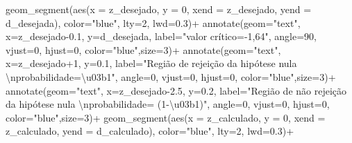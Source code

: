 \documentclass[
]{book}
\newenvironment{Shaded}{\begin{snugshade}}{\end{snugshade}}
\newcommand{\AttributeTok}[1]{\textcolor[rgb]{0.77,0.63,0.00}{#1}}
\newcommand{\DecValTok}[1]{\textcolor[rgb]{0.00,0.00,0.81}{#1}}
\newcommand{\FloatTok}[1]{\textcolor[rgb]{0.00,0.00,0.81}{#1}}
\newcommand{\FunctionTok}[1]{\textcolor[rgb]{0.00,0.00,0.00}{#1}}
\newcommand{\NormalTok}[1]{#1}
\newcommand{\SpecialCharTok}[1]{\textcolor[rgb]{0.00,0.00,0.00}{#1}}
\newcommand{\StringTok}[1]{\textcolor[rgb]{0.31,0.60,0.02}{#1}}
\begin{document}
\begin{Shaded}
\begin{Highlighting}[]
\FunctionTok{geom\_segment}\NormalTok{(}\FunctionTok{aes}\NormalTok{(}\AttributeTok{x =}\NormalTok{ z\_desejado, }\AttributeTok{y =} \DecValTok{0}\NormalTok{, }\AttributeTok{xend =}\NormalTok{ z\_desejado, }\AttributeTok{yend =}\NormalTok{ d\_desejada), }\AttributeTok{color=}\StringTok{"blue"}\NormalTok{, }\AttributeTok{lty=}\DecValTok{2}\NormalTok{, }\AttributeTok{lwd=}\FloatTok{0.3}\NormalTok{)}\SpecialCharTok{+}
\FunctionTok{annotate}\NormalTok{(}\AttributeTok{geom=}\StringTok{"text"}\NormalTok{, }\AttributeTok{x=}\NormalTok{z\_desejado}\FloatTok{{-}0.1}\NormalTok{, }\AttributeTok{y=}\NormalTok{d\_desejada, }\AttributeTok{label=}\StringTok{"valor crítico={-}1,64"}\NormalTok{, }\AttributeTok{angle=}\DecValTok{90}\NormalTok{, }\AttributeTok{vjust=}\DecValTok{0}\NormalTok{, }\AttributeTok{hjust=}\DecValTok{0}\NormalTok{, }\AttributeTok{color=}\StringTok{"blue"}\NormalTok{,}\AttributeTok{size=}\DecValTok{3}\NormalTok{)}\SpecialCharTok{+}
\FunctionTok{annotate}\NormalTok{(}\AttributeTok{geom=}\StringTok{"text"}\NormalTok{, }\AttributeTok{x=}\NormalTok{z\_desejado}\SpecialCharTok{+}\DecValTok{1}\NormalTok{, }\AttributeTok{y=}\FloatTok{0.1}\NormalTok{, }\AttributeTok{label=}\StringTok{"Região de rejeição da hipótese nula }\SpecialCharTok{\textbackslash{}n}\StringTok{probabilidade=\textbackslash{}u03b1"}\NormalTok{, }\AttributeTok{angle=}\DecValTok{0}\NormalTok{, }\AttributeTok{vjust=}\DecValTok{0}\NormalTok{, }\AttributeTok{hjust=}\DecValTok{0}\NormalTok{, }\AttributeTok{color=}\StringTok{"blue"}\NormalTok{,}\AttributeTok{size=}\DecValTok{3}\NormalTok{)}\SpecialCharTok{+}
\FunctionTok{annotate}\NormalTok{(}\AttributeTok{geom=}\StringTok{"text"}\NormalTok{, }\AttributeTok{x=}\NormalTok{z\_desejado}\FloatTok{{-}2.5}\NormalTok{, }\AttributeTok{y=}\FloatTok{0.2}\NormalTok{, }\AttributeTok{label=}\StringTok{"Região de não rejeição da hipótese nula  }\SpecialCharTok{\textbackslash{}n}\StringTok{probabilidade= (1{-}\textbackslash{}u03b1)"}\NormalTok{, }\AttributeTok{angle=}\DecValTok{0}\NormalTok{, }\AttributeTok{vjust=}\DecValTok{0}\NormalTok{, }\AttributeTok{hjust=}\DecValTok{0}\NormalTok{, }\AttributeTok{color=}\StringTok{"blue"}\NormalTok{,}\AttributeTok{size=}\DecValTok{3}\NormalTok{)}\SpecialCharTok{+}
  \FunctionTok{geom\_segment}\NormalTok{(}\FunctionTok{aes}\NormalTok{(}\AttributeTok{x =}\NormalTok{ z\_calculado, }\AttributeTok{y =} \DecValTok{0}\NormalTok{, }\AttributeTok{xend =}\NormalTok{ z\_calculado, }\AttributeTok{yend =}\NormalTok{ d\_calculado), }\AttributeTok{color=}\StringTok{"blue"}\NormalTok{, }\AttributeTok{lty=}\DecValTok{2}\NormalTok{, }\AttributeTok{lwd=}\FloatTok{0.3}\NormalTok{)}\SpecialCharTok{+}

\end{Highlighting}
\end{Shaded}
\end{document}
